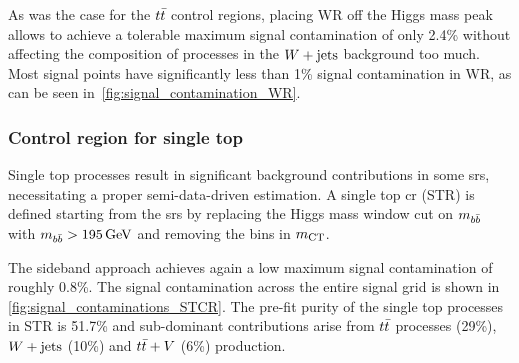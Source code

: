 As was the case for the $t\bar{t}$ control regions, placing WR off the Higgs mass peak allows to achieve a tolerable maximum signal contamination of only 2.4\% without affecting the composition of processes in the $W+\mathrm{jets}$ background too much. Most signal points have significantly less than 1\% signal contamination in WR, as can be seen in~\cref{fig:signal_contamination_WR}. 


\subsubsection{Control region for single top}

Single top processes result in significant background contributions in some \glspl{sr}, necessitating a proper semi-data-driven estimation. A single top \gls{cr} (STR) is defined starting from the \glspl{sr} by replacing the Higgs mass window cut on $m_{b\bar{b}}$ with $\mbb > \SI{195}{\GeV}$ and removing the bins in $m_{\textrm{CT}}$. 

The sideband approach achieves again a low maximum signal contamination of roughly 0.8\%. The signal contamination across the entire signal grid is shown in \cref{fig:signal_contaminations_STCR}. The pre-fit purity of the single top processes in STR is 51.7\% and sub-dominant contributions arise from $t\bar{t}$ processes (29\%), $W+\mathrm{jets}$ (10\%) and $t\bar{t}+V$ (6\%) production. 

